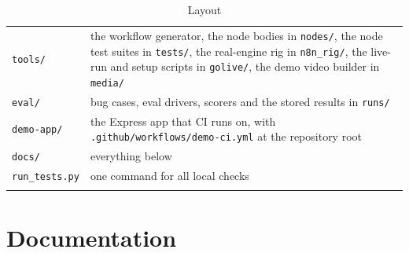 \begin{longtable}{>{\raggedright\arraybackslash}p{0.376\dimexpr\linewidth-4\tabcolsep\relax}>{\raggedright\arraybackslash}p{0.624\dimexpr\linewidth-4\tabcolsep\relax}}
\texttt{tools/\allowbreak{}} & the workflow generator, the node bodies in \texttt{nodes/\allowbreak{}}, the node test suites in \texttt{tests/\allowbreak{}}, the real-engine rig in \texttt{n8n\_\allowbreak{}rig/\allowbreak{}}, the live-run and setup scripts in \texttt{golive/\allowbreak{}}, the demo video builder in \texttt{media/\allowbreak{}} \\
\texttt{eval/\allowbreak{}} & bug cases, eval drivers, scorers and the stored results in \texttt{runs/\allowbreak{}} \\
\texttt{demo-\allowbreak{}app/\allowbreak{}} & the Express app that CI runs on, with \texttt{.\allowbreak{}github/\allowbreak{}workflows/\allowbreak{}demo-\allowbreak{}ci.\allowbreak{}yml} at the repository root \\
\texttt{docs/\allowbreak{}} & everything below \\
\texttt{run\_\allowbreak{}tests.\allowbreak{}py} & one command for all local checks \\
\bottomrule
\caption{Layout}\label{tab:appendix-1}\\
\end{longtable}
\endgroup

\section{Documentation}

